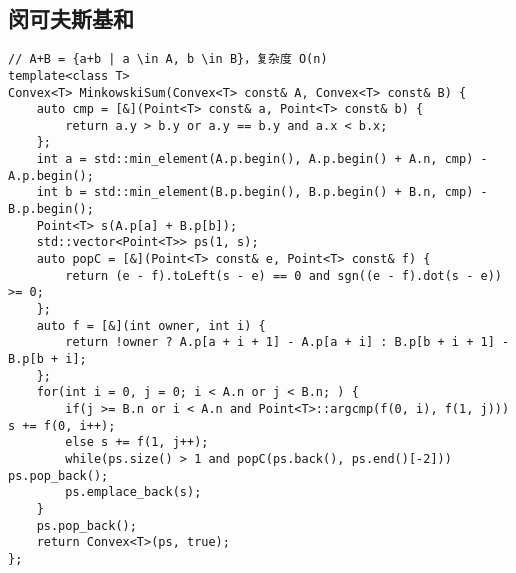 \subsection{闵可夫斯基和}
\begin{lstlisting}
// A+B = {a+b | a \in A, b \in B}，复杂度 O(n)
template<class T>
Convex<T> MinkowskiSum(Convex<T> const& A, Convex<T> const& B) {
    auto cmp = [&](Point<T> const& a, Point<T> const& b) {
        return a.y > b.y or a.y == b.y and a.x < b.x;
    };
    int a = std::min_element(A.p.begin(), A.p.begin() + A.n, cmp) - A.p.begin();
    int b = std::min_element(B.p.begin(), B.p.begin() + B.n, cmp) - B.p.begin();
    Point<T> s(A.p[a] + B.p[b]);
    std::vector<Point<T>> ps(1, s);
    auto popC = [&](Point<T> const& e, Point<T> const& f) {
        return (e - f).toLeft(s - e) == 0 and sgn((e - f).dot(s - e)) >= 0;
    };
    auto f = [&](int owner, int i) {
        return !owner ? A.p[a + i + 1] - A.p[a + i] : B.p[b + i + 1] - B.p[b + i];
    };
    for(int i = 0, j = 0; i < A.n or j < B.n; ) {
        if(j >= B.n or i < A.n and Point<T>::argcmp(f(0, i), f(1, j))) s += f(0, i++);
        else s += f(1, j++);
        while(ps.size() > 1 and popC(ps.back(), ps.end()[-2])) ps.pop_back();
        ps.emplace_back(s);
    }
    ps.pop_back();
    return Convex<T>(ps, true);
};
\end{lstlisting}

